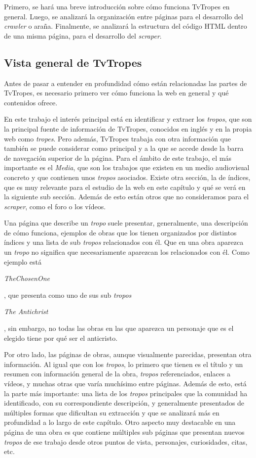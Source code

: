Primero, se hará una breve introducción sobre cómo funciona TvTropes en general.
Luego, se analizará la organización entre páginas para el desarrollo del
\textit{crawler} o araña. Finalmente, se analizará la estructura del código HTML
dentro de una misma página, para el desarrollo del \textit{scraper}.

\subsection{Vista general de TvTropes}
Antes de pasar a entender en profundidad cómo están relacionadas las partes de
TvTropes, es necesario primero ver cómo funciona la web en general y qué
contenidos ofrece.

En este trabajo el interés principal está en identificar y extraer los
\textit{tropos}, que son la principal fuente de información de TvTropes,
conocidos en inglés y en la propia web como \textit{tropes}. Pero además,
TvTropes trabaja con otra información que también se puede considerar como
principal y a la que se accede desde la barra de navegación superior de la
página. Para el ámbito de este trabajo, el más importante es el \textit{Media},
que son los trabajos que existen en un medio audiovisual concreto y que
contienen unos \textit{tropos} asociados. Existe otra sección, la de índices,
que es muy relevante para el estudio de la web en este capítulo y qué se verá en
la siguiente sub sección. Además de esto están otros que no consideramos para el
\textit{scraper}, como el foro o los vídeos.

Una página que describe un \textit{tropo} suele presentar, generalmente, una
descripción de cómo funciona, ejemplos de obras que los tienen organizados por
distintos índices y una lista de sub \textit{tropos} relacionados con él. Que en
una obra aparezca un \textit{tropo} no significa que necesariamente aparezcan
los relacionados con él. Como ejemplo está
\begin{otherlanguage}{english}\textit{TheChosenOne}\end{otherlanguage}, que
presenta como uno de sus sub \textit{tropos}
\begin{otherlanguage}{english}\textit{The Antichrist}\end{otherlanguage}, sin
embargo, no todas las obras en las que aparezca un personaje que es el elegido
tiene por qué ser el anticristo.

Por otro lado, las páginas de obras, aunque visualmente parecidas, presentan
otra información. Al igual que con los \textit{tropos}, lo primero que tienen es
el título y un resumen con información general de la obra, \textit{tropos}
referenciados, enlaces a vídeos, y muchas otras que varía muchísimo entre
páginas. Además de esto, está la parte más importante: una lista de los
\textit{tropos} principales que la comunidad ha identificado, con su
correspondiente descripción, y generalmente presentados de múltiples formas que
dificultan su extracción y que se analizará más en profundidad a lo largo de
este capítulo. Otro aspecto muy destacable en una página de una obra es que
contiene múltiples sub páginas que presentan nuevos \textit{tropos} de ese
trabajo desde otros puntos de vista, personajes, curiosidades, citas, etc.

